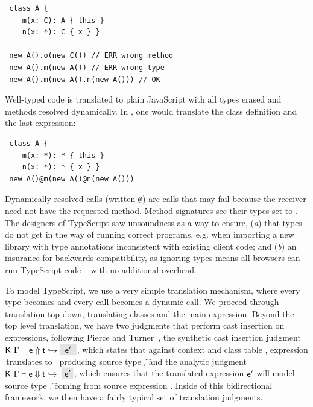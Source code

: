 \documentclass[acmlarge, anonymous, authordraft]{acmart}
\newcommand{\code}[1]{{\tt #1}\xspace}
\begin{document}
\begin{lstlisting}
 class A { 
    m(x: C): A { this }
    n(x: *): C { x } }

 new A().o(new C()) // ERR wrong method
 new A().m(new A()) // ERR wrong type
 new A().m(new A().n(new A())) // OK 
\end{lstlisting}

\noindent
Well-typed code is translated to plain JavaScript with all types erased and
methods resolved dynamically. In \kafka, one would translate the class
definition and the last expression:

\begin{lstlisting}
 class A { 
    m(x: *): * { this }
    n(x: *): * { x } }
 new A()@m(new A()@n(new A()))    
\end{lstlisting}

\noindent Dynamically resolved calls (written \code @) are calls that may fail
because the receiver need not have the requested method. Method signatures see
their types set to \any.  The designers of TypeScript saw unsoundness as a way
to ensure, ({\em a}) that types do not get in the way of running correct
programs, e.g. when importing a new library with type annotations inconsistent
with existing client code; and ({\em b}) an insurance for backwards
compatibility, as ignoring types means all browsers can run TypeScript code --
with no additional overhead.

To model TypeScript, we use a very simple translation mechanism, where every
type becomes \any and every call becomes a dynamic call.  We proceed through
translation top-down, translating classes and the main expression.  Beyond
the top level translation, we have two judgments that perform cast insertion
on expressions, following Pierce and Turner~\cite{pierce:1998:local}, the
synthetic cast insertion judgment $\GenCast\K\Env\e\ep\t$, which states that
against context \Env and class table \src\K, expression \src\e\,translates to
\ep\, producing source type \src\t, and the analytic judgment
$\AnaCast\K\Env\e\ep\t$, which ensures that the translated expression ${{{\sf{e'}}}}$
will model source type \src\t, coming from source expression \src\e.  Inside
of this bidirectional framework, we then have a fairly typical set of
translation judgments.
\end{document}
